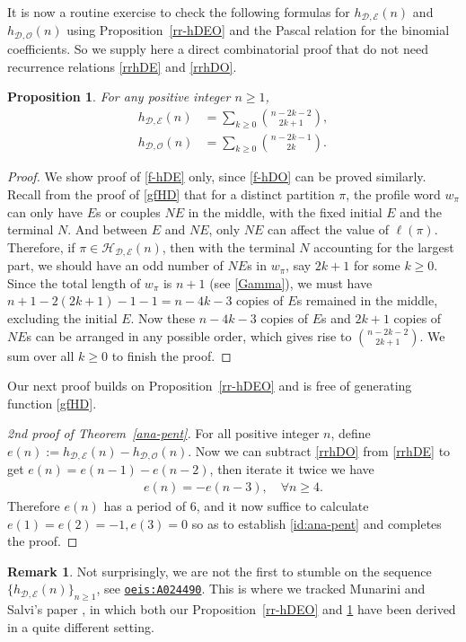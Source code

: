 \documentclass[12pt]{amsart}
\numberwithin{equation}{section}
\theoremstyle{plain}
\newtheorem{proposition}[theorem]{Proposition}
\theoremstyle{definition}
\newtheorem{remark}[theorem]{Remark}
\def\D{\mathcal{D}}
\def\O{\mathcal{O}}
\def\H{\mathcal{H}}
\def\E{\mathcal{E}}
\begin{document}
It is now a routine exercise to check the following formulas for $h_{\D,\E}(n)$ and $h_{\D,\O}(n)$ using Proposition~\ref{rr-hDEO} and the Pascal relation for the binomial coefficients. So we supply here a direct combinatorial proof that do not need recurrence relations \eqref{rrhDE} and \eqref{rrhDO}.
\begin{proposition}\label{formula-hDEO}
For any positive integer $n\geq 1$,
\begin{align}
h_{\D,\E}(n) &=\sum_{k\geq0}\binom{n-2k-2}{2k+1},\label{f-hDE}\\
h_{\D,\O}(n) &=\sum_{k\geq0}\binom{n-2k-1}{2k}.\label{f-hDO}
\end{align}
\end{proposition}
\begin{proof}
We show proof of \eqref{f-hDE} only, since \eqref{f-hDO} can be proved similarly. Recall from the proof of \eqref{gfHD} that for a distinct partition $\pi$, the profile word $w_{\pi}$ can only have $E$s or couples $NE$ in the middle, with the fixed initial $E$ and the terminal $N$. And between $E$ and $NE$, only $NE$ can affect the value of $\ell(\pi)$. Therefore, if $\pi\in\H_{\D,\E}(n)$, then with the terminal $N$ accounting for the largest part, we should have an odd number of $NE$s in $w_{\pi}$, say $2k+1$ for some $k\geq 0$. Since the total length of $w_{\pi}$ is $n+1$ (see \eqref{Gamma}), we must have $n+1-2(2k+1)-1-1=n-4k-3$ copies of $E$s remained in the middle, excluding the initial $E$. Now these $n-4k-3$ copies of $E$s and $2k+1$ copies of $NE$s can be arranged in any possible order, which gives rise to $\binom{n-2k-2}{2k+1}$. We sum over all $k\geq 0$ to finish the proof.
\end{proof}

Our next proof builds on Proposition~\ref{rr-hDEO} and is free of generating function \eqref{gfHD}.

\begin{proof}[2nd proof of Theorem~\ref{ana-pent}]
For all positive integer $n$, define $e(n):=h_{\D,\E}(n)-h_{\D,\O}(n)$. Now we can subtract \eqref{rrhDO} from \eqref{rrhDE} to get $e(n)=e(n-1)-e(n-2)$, then iterate it twice we have
\begin{align*}
e(n)=-e(n-3),\quad \forall n\geq 4.
\end{align*}
Therefore $e(n)$ has a period of $6$, and it now suffice to calculate $e(1)=e(2)=-1,e(3)=0$ so as to establish \eqref{id:ana-pent} and completes the proof.
\end{proof}
\begin{remark}
Not surprisingly, we are not the first to stumble on the sequence $\{h_{\D,\E}(n)\}_{n\geq 1}$, see \href{http://oeis.org/A024490}{\tt{oeis:A024490}}. This is where we tracked Munarini and Salvi's paper \cite{MS}, in which both our Proposition~\ref{rr-hDEO} and \ref{formula-hDEO} have been derived in a quite different setting.
\end{remark}
\end{document}

